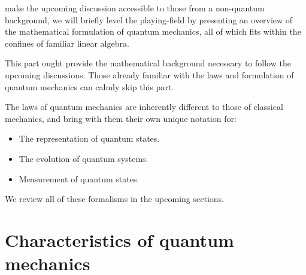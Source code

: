  make the upcoming discussion accessible to those from a non-quantum background, we will briefly level the playing-field by presenting an overview of the mathematical formulation of quantum mechanics, all of which fits within the confines of familiar linear algebra.

This part ought provide the mathematical background necessary to follow the upcoming discussions. Those already familiar with the laws and formulation of quantum mechanics can calmly skip this part.

The laws of quantum mechanics are inherently different to those of classical mechanics, and bring with them their own unique notation for:
\begin{itemize}
	\item The representation of quantum states.
	\item The evolution of quantum systems.
	\item Measurement of quantum states.
\end{itemize}
We review all of these formalisms in the upcoming sections.


%
%

\section{Characteristics of quantum mechanics}

